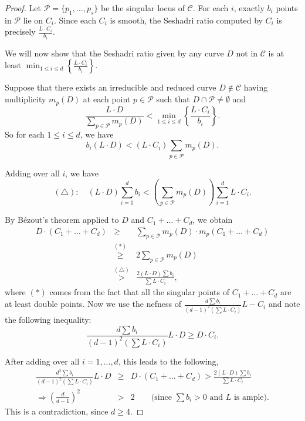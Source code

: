\documentclass[12pt,reqno]{amsart}
\theoremstyle{plain}
\numberwithin{equation}{section}
\theoremstyle{definition}
\begin{document}
	\begin{proof}
	 Let $\mathcal{P} = \{p_{1}, \ldots, p_{s}\}$ be the singular locus of  $\mathcal{C}$. For each $i$, exactly $b_i$ points in $\mathcal{P}$  lie on $C_i$. Since each $C_i$ is smooth, the Seshadri ratio computed by $C_i$ is precisely 
	  $ \frac{L\cdot C_i}{b_i}$. %
	 

  We will now show that the Seshadri ratio given by any curve $D$ not in $\mathcal{C}$ is at least $\min_{1\le i\le d}
  {\left\{\frac{L\cdot C_i}{b_i}\right\}}$. 
  
	 Suppose that there exists an irreducible and reduced curve $D\notin \mathcal{C}$ having multiplicity $m_{p}(D)$ at each point $p \in \mathcal{P}$ such that $D \cap \mathcal{P} \ne \emptyset$ and 
		$$\frac{L \cdot D}{\sum_{p \in \mathcal{P}} m_{p}(D)} < \min_{1\le i \le d}\left\{\frac{L\cdot C_i}{b_i}\right\}.$$
So for each $1 \le i \le d$, we have 
                $$b_i(L \cdot D)  < (L\cdot C_i) \sum_{p \in \mathcal{P}} m_{p}(D).$$ 
                
Adding over all $i$, we have 
		$$(\triangle) : \quad (L \cdot D)\sum_{i=1}^d b_i < \left(\sum_{p \in \mathcal{P}} m_{p}(D)\right)\sum_{i=1}^d L\cdot C_i.$$

  By B\'ezout's theorem applied to $D$ and $C_1+\dots+C_d$, we obtain
		\begin{eqnarray*}
		 D\cdot (C_{1}+ \ldots + C_{d}) &\geq& \sum_{p \in \mathcal{P}}m_{p}(D)\cdot m_{p}(C_{1}+ \ldots + C_{d})\\
		&\stackrel{(*)}{\geq}& 2\sum_{p \in \mathcal{P}} m_{p}(D) \\
		&\stackrel{(\triangle)}{>}& \frac{2(L \cdot D)\sum b_i}{\sum L\cdot C_i},
		\end{eqnarray*}
		where $(*)$ comes from the fact that all the singular points of $C_{1}+ \ldots + C_{d}$ are at least double points. Now we use the nefness 
		of $\frac{d\sum b_i}{(d-1)^2(\sum L\cdot C_i)}L-C_i$ and note the following  inequality: 
		\[
		\frac{d\sum b_i}{(d-1)^2(\sum L\cdot C_i)}L\cdot D \geq D\cdot C_i.
		\] 
  
		After adding over all $i=1,...,d$, this leads to the following, 
		\begin{eqnarray*}
			\frac{d^2\sum b_i}{(d-1)^2(\sum L\cdot C_i)}L\cdot D &\geq&  D\cdot (C_{1}+ \ldots + C_{d}) > \frac{2(L \cdot D)\sum b_i}{\sum L\cdot C_i} \\
			\Rightarrow \left(\frac{d}{d-1} \right)^2 &>& 2 \quad \quad \text{(since $\sum b_i > 0$ and $L$ is ample)}.
		\end{eqnarray*}
		This is a contradiction, since $d\geq 4$.
	\end{proof}
\end{document}
